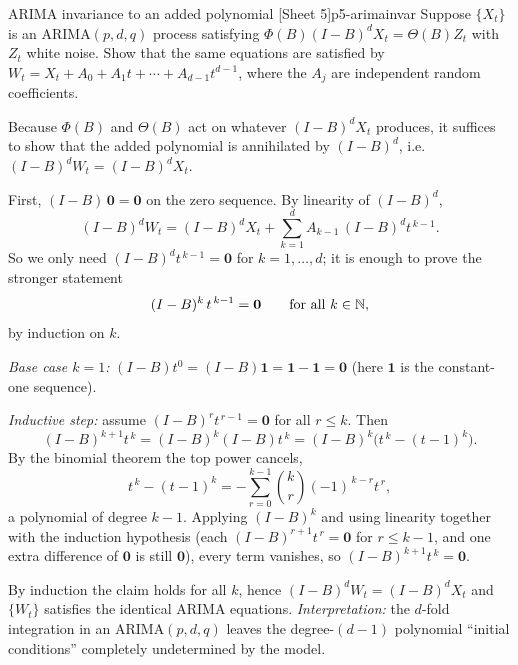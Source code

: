 \begin{exercise}{ARIMA invariance to an added polynomial \quad\textnormal{[Sheet 5]}}{p5-arimainvar}
Suppose $\{X_t\}$ is an ARIMA$(p,d,q)$ process satisfying
$\Phi(B)(I-B)^{d}X_t=\Theta(B)Z_t$ with $Z_t$ white noise. Show that the same
equations are satisfied by $W_t=X_t+A_0+A_1t+\cdots+A_{d-1}t^{d-1}$, where the
$A_j$ are independent random coefficients.
\end{exercise}
\begin{solution}
Because $\Phi(B)$ and $\Theta(B)$ act on whatever $(I-B)^{d}X_t$ produces, it
suffices to show that the added polynomial is annihilated by $(I-B)^{d}$, i.e.\
$(I-B)^{d}W_t=(I-B)^{d}X_t$.

First, $(I-B)\,\mathbf 0=\mathbf 0$ on the zero sequence. By linearity of
$(I-B)^{d}$,
\[
(I-B)^{d}W_t=(I-B)^{d}X_t
+\sum_{k=1}^{d}A_{k-1}\,(I-B)^{d}t^{\,k-1}.
\]
So we only need $(I-B)^{d}t^{\,k-1}=\mathbf 0$ for $k=1,\dots,d$; it is enough to
prove the stronger statement
\[
(I-B)^{k}\,t^{\,k-1}=\mathbf 0\qquad\text{for all }k\in\mathbb{N} ,
\]
by induction on $k$.

\emph{Base case $k=1$:} $(I-B)t^{0}=(I-B)\mathbf 1=\mathbf 1-\mathbf 1=\mathbf 0$
(here $\mathbf 1$ is the constant-one sequence).

\emph{Inductive step:} assume $(I-B)^{r}t^{\,r-1}=\mathbf 0$ for all $r\le k$.
Then
\[
(I-B)^{k+1}t^{\,k}=(I-B)^{k}(I-B)t^{\,k}
=(I-B)^{k}\bigl(t^{\,k}-(t-1)^{k}\bigr).
\]
By the binomial theorem the top power cancels,
\[
t^{\,k}-(t-1)^{k}
=-\sum_{r=0}^{k-1}\binom{k}{r}(-1)^{\,k-r}t^{\,r},
\]
a polynomial of degree $k-1$. Applying $(I-B)^{k}$ and using linearity together
with the induction hypothesis (each $(I-B)^{r+1}t^{\,r}=\mathbf 0$ for
$r\le k-1$, and one extra difference of $\mathbf 0$ is still $\mathbf 0$), every
term vanishes, so $(I-B)^{k+1}t^{\,k}=\mathbf 0$.

By induction the claim holds for all $k$, hence $(I-B)^{d}W_t=(I-B)^{d}X_t$ and
$\{W_t\}$ satisfies the identical ARIMA equations. \emph{Interpretation:} the
$d$-fold integration in an ARIMA$(p,d,q)$ leaves the degree-$(d-1)$ polynomial
``initial conditions'' completely undetermined by the model.
\end{solution}

